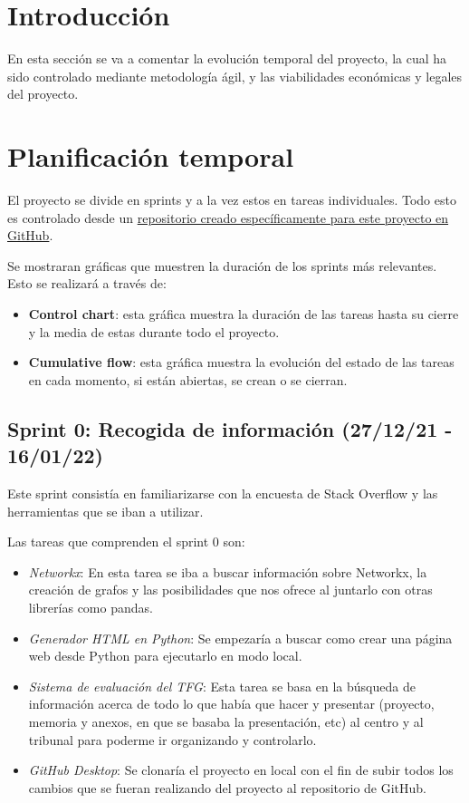 
\section{Introducción}
En esta sección se va a comentar la evolución temporal del proyecto, la cual ha sido controlado mediante metodología ágil, y las viabilidades económicas y legales del proyecto.

\section{Planificación temporal}
El proyecto se divide en sprints y a la vez estos en tareas individuales. Todo esto es controlado desde un \href{https://github.com/eca1001/TFG}{repositorio creado específicamente para este proyecto en GitHub}. 

Se mostraran gráficas que muestren la duración de los sprints más relevantes. Esto se realizará a través de:

\begin{itemize}
    \item \textbf{Control chart}: esta gráfica muestra la duración de las tareas hasta su cierre y la media de estas durante todo el proyecto.
    \item \textbf{Cumulative flow}: esta gráfica muestra la evolución del estado de las tareas en cada momento, si están abiertas, se crean o se cierran.
\end{itemize}

\subsection{Sprint 0: Recogida de información (27/12/21 - 16/01/22)}
Este sprint consistía en familiarizarse con la encuesta de Stack Overflow y las herramientas que se iban a utilizar.

Las tareas que comprenden el sprint 0 son:
\begin{itemize}
    \item \textit{Networkx}: En esta tarea se iba a buscar información sobre Networkx, la creación de grafos y las posibilidades que nos ofrece al juntarlo con otras librerías como pandas.
    \item \textit{Generador HTML en Python}: Se empezaría a buscar como crear una página web desde Python para ejecutarlo en modo local.
    \item \textit{Sistema de evaluación del TFG}: Esta tarea se basa en la búsqueda de información acerca de todo lo que había que hacer y presentar (proyecto, memoria y anexos, en que se basaba la presentación, etc) al centro y al tribunal para poderme ir organizando y controlarlo.
    \item \textit{GitHub Desktop}: Se clonaría el proyecto en local con el fin de subir todos los cambios que se fueran realizando del proyecto al repositorio de GitHub.
\end{itemize}

